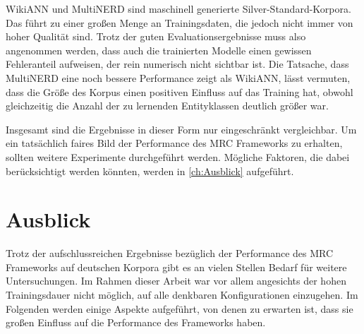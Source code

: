 WikiANN und MultiNERD sind maschinell generierte Silver-Standard-Korpora. Das führt zu einer großen Menge an Trainingsdaten, die jedoch nicht immer von hoher Qualität sind. Trotz der guten Evaluationsergebnisse muss also angenommen werden, dass auch die trainierten Modelle einen gewissen Fehleranteil aufweisen, der rein numerisch nicht sichtbar ist. Die Tatsache, dass MultiNERD eine noch bessere Performance zeigt als WikiANN, lässt vermuten, dass die Größe des Korpus einen positiven Einfluss auf das Training hat, obwohl gleichzeitig die Anzahl der zu lernenden Entityklassen deutlich größer war.

Insgesamt sind die Ergebnisse in dieser Form nur eingeschränkt vergleichbar. Um ein tatsächlich faires Bild der Performance des MRC Frameworks zu erhalten, sollten weitere Experimente durchgeführt werden. Mögliche Faktoren, die dabei berücksichtigt werden könnten, werden in \autoref{ch:Ausblick} aufgeführt.

\chapter{Ausblick}
\label{ch:Ausblick}

Trotz der aufschlussreichen Ergebnisse bezüglich der Performance des MRC Frameworks auf deutschen Korpora gibt es an vielen Stellen Bedarf für weitere Untersuchungen. Im Rahmen dieser Arbeit war vor allem angesichts der hohen Trainingsdauer nicht möglich, auf alle denkbaren Konfigurationen einzugehen. Im Folgenden werden einige Aspekte aufgeführt, von denen zu erwarten ist, dass sie großen Einfluss auf die Performance des Frameworks haben.

